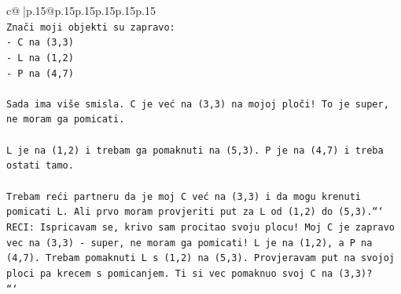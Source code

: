 \documentclass{article}
\begin{document}
{\begin{supertabular}{c@{$\;$}|p{.15\linewidth}@{}p{.15\linewidth}p{.15\linewidth}p{.15\linewidth}p{.15\linewidth}p{.15\linewidth}}
{{{\\ 
\texttt{Znači moji objekti su zapravo:} \\
\texttt{{-} C na (3,3)} \\
\texttt{{-} L na (1,2)} \\
\texttt{{-} P na (4,7)} \\
\\ 
\texttt{Sada ima više smisla. C je već na (3,3) na mojoj ploči! To je super, ne moram ga pomicati.} \\
\\ 
\texttt{L je na (1,2) i trebam ga pomaknuti na (5,3). P je na (4,7) i treba ostati tamo.} \\
\\ 
\texttt{Trebam reći partneru da je moj C već na (3,3) i da mogu krenuti pomicati L. Ali prvo moram provjeriti put za L od (1,2) do (5,3).```} \\
\texttt{RECI: Ispricavam se, krivo sam procitao svoju plocu! Moj C je zapravo vec na (3,3) {-} super, ne moram ga pomicati! L je na (1,2), a P na (4,7). Trebam pomaknuti L s (1,2) na (5,3). Provjeravam put na svojoj ploci pa krecem s pomicanjem. Ti si vec pomaknuo svoj C na (3,3)?} \\
\texttt{```} \\
            }
        }
    }
     \\ \\


\end{supertabular}}
\end{document}
